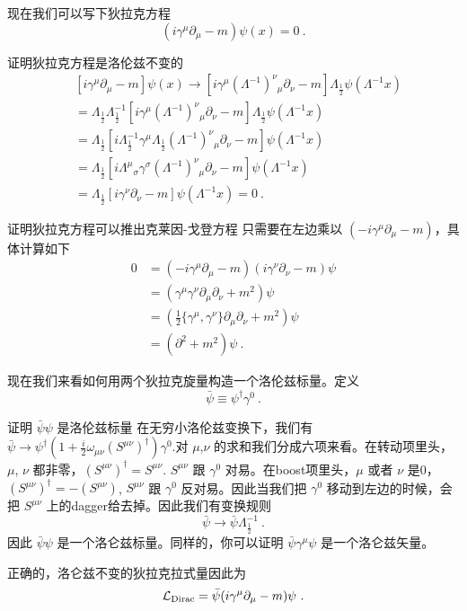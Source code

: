 现在我们可以写下狄拉克方程
\begin{equation}
(i\gamma^\mu \partial_\mu - m)\psi(x)=0~.
\end{equation}
\begin{exercise}{证明狄拉克方程是洛伦兹不变的}
\begin{align}\nonumber
& [i\gamma^\mu\partial_\mu - m]\psi(x)\rightarrow [i\gamma^\mu(\Lambda^{-1})^\nu{}_\mu\partial_\nu - m]\Lambda_{\frac{1}{2}}\psi(\Lambda^{-1}x) \\\nonumber
& = \Lambda_{\frac{1}{2}}\Lambda^{-1}_{\frac{1}{2}}[i\gamma^\mu(\Lambda^{-1})^\nu{}_\mu\partial_\nu-m]\Lambda_{\frac{1}{2}}\psi(\Lambda^{-1}x) \\\nonumber
& =  \Lambda_{\frac{1}{2}}[i\Lambda_{\frac{1}{2}}^{-1}\gamma^\mu \Lambda_{\frac{1}{2}}(\Lambda^{-1})^\nu{}_\mu\partial_\nu - m]\psi(\Lambda^{-1}x) \\\nonumber
& = \Lambda_{\frac{1}{2} } [i\Lambda^\mu{}_\sigma\gamma^\sigma(\Lambda^{-1})^\nu{}_\mu\partial_\nu - m]\psi(\Lambda^{-1}x) \\
& = \Lambda_{\frac{1}{2}} [i \gamma^\nu\partial_\nu - m]\psi(\Lambda^{-1}x) = 0~.
\end{align}
\end{exercise}
\begin{exercise}{证明狄拉克方程可以推出克莱因-戈登方程}
只需要在左边乘以 $(-i\gamma^\mu\partial_\mu - m)$，具体计算如下
\begin{align}\nonumber
0 & =(-i\gamma^\mu\partial_\mu-m)(i\gamma^\nu\partial_\nu-m)\psi \\\nonumber
& = (\gamma^\mu\gamma^\nu\partial_\mu\partial_\nu+m^2)\psi \\\nonumber
& = (\frac{1}{2}\{\gamma^\mu,\gamma^\nu\}\partial_\mu\partial_\nu+m^2)\psi \\
& = (\partial^2+m^2)\psi ~.
\end{align}
\end{exercise}
现在我们来看如何用两个狄拉克旋量构造一个洛伦兹标量。定义
\begin{equation}
\bar \psi \equiv \psi^\dagger \gamma^0~.
\end{equation}
\begin{exercise}{证明 $\bar\psi \psi$ 是洛伦兹标量}
在无穷小洛伦兹变换下，我们有 $\bar\psi \rightarrow \psi^\dagger(1+\frac{i}{2}\omega_{\mu\nu}(S^{\mu\nu})^\dagger)\gamma^0$.对 $\mu$,$\nu$ 的求和我们分成六项来看。在转动项里头，$\mu$, $\nu$ 都非零，$(S^{\mu\nu})^\dagger = S^{\mu\nu}$. $S^{\mu\nu}$ 跟 $\gamma^0$ 对易。在boost项里头，$\mu$ 或者 $\nu$ 是0，$(S^{\mu\nu})^\dagger = -(S^{\mu\nu})$, $S^{\mu\nu}$ 跟 $\gamma^0$ 反对易。因此当我们把 $\gamma^0$ 移动到左边的时候，会把 $S^{\mu\nu}$ 上的dagger给去掉。因此我们有变换规则
\begin{equation}
\bar \psi \rightarrow \bar\psi \Lambda_{\frac{1}{2}}^{-1}~.
\end{equation}
因此 $\bar\psi\psi$ 是一个洛仑兹标量。同样的，你可以证明 $\bar\psi\gamma^\mu\psi$ 是一个洛仑兹矢量。
\end{exercise}
正确的，洛仑兹不变的狄拉克拉式量因此为
\begin{equation}
\mathcal L_{\rm Dirac} = \bar\psi (i\gamma^\mu\partial_\mu - m)\psi~.
\end{equation} 


